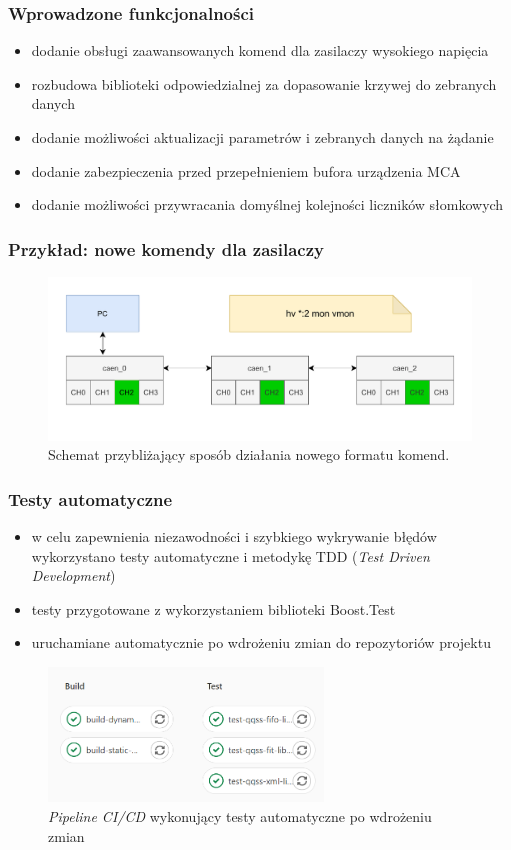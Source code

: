 \documentclass[10pt]{beamer}
\begin{document}
\begin{frame}
\frametitle{Wprowadzone funkcjonalności}
\begin{itemize}
    \item dodanie obsługi zaawansowanych komend dla zasilaczy wysokiego napięcia
    \item rozbudowa biblioteki odpowiedzialnej za dopasowanie krzywej do zebranych danych
    \item dodanie możliwości aktualizacji parametrów i zebranych danych na żądanie
    \item dodanie zabezpieczenia przed przepełnieniem bufora urządzenia MCA
    \item dodanie możliwości przywracania domyślnej kolejności liczników słomkowych
\end{itemize}
\end{frame}

\begin{frame}
\frametitle{Przykład: nowe komendy dla zasilaczy}
\begin{figure}
\includegraphics[width=\textwidth]{static/hv_psu_1.pdf}
\caption{Schemat przybliżający sposób działania nowego formatu komend.}
\end{figure}
\end{frame}

\begin{frame}
\frametitle{Testy automatyczne}
\begin{itemize}
    \item w celu zapewnienia niezawodności i szybkiego wykrywanie błędów wykorzystano testy automatyczne i metodykę TDD (\emph{Test Driven Development})
    \item testy przygotowane z wykorzystaniem biblioteki Boost.Test
    \item uruchamiane automatycznie po wdrożeniu zmian do repozytoriów projektu
\end{itemize}
\begin{figure}
\includegraphics[width=0.65\textwidth]{static/pipeline.png}
\caption{\emph{Pipeline CI/CD} wykonujący testy automatyczne po wdrożeniu zmian}
\end{figure}
\end{frame}
\end{document}
